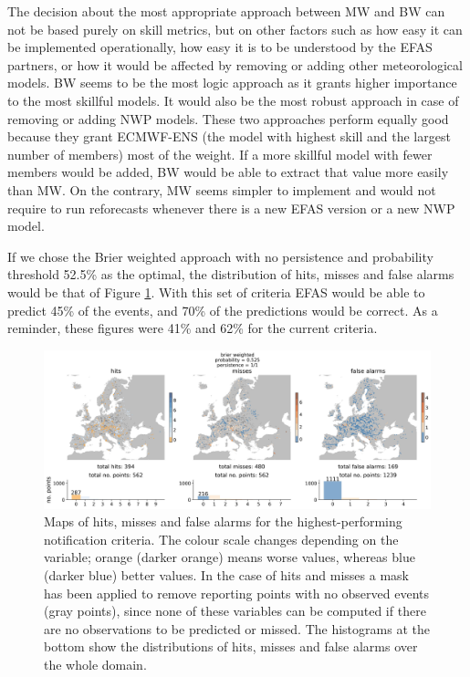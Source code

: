 \documentclass[preprint,12pt]{elsarticle}
\begin{document}
The decision about the most appropriate approach between MW and BW can not be based purely on skill metrics, but on other factors such as how easy it can be implemented operationally, how easy it is to be understood by the EFAS partners, or how it would be affected by removing or adding other meteorological models. BW seems to be the most logic approach as it grants higher importance to the most skillful models. It would also be the most robust approach in case of removing or adding NWP models. These two approaches perform equally good because they grant ECMWF-ENS (the model with highest skill and the largest number of members) most of the weight. If a more skillful model with fewer members would be added, BW would be able to extract that value more easily than MW. On the contrary, MW seems simpler to implement and would not require to run reforecasts whenever there is a new EFAS version or a new NWP model.

If we chose the Brier weighted approach with no persistence and probability threshold 52.5\% as the optimal, the distribution of hits, misses and false alarms would be that of Figure \ref{fig:maps_BW}. With this set of criteria EFAS would be able to predict 45\% of the events, and 70\% of the predictions would be correct. As a reminder, these figures were 41\% and 62\% for the current criteria.

\begin{figure}
    \centering
    \includegraphics[width=1\textwidth]{figures/hits_maps_reporting_points_2000km2_1239points_brier_weighted_060h.jpg}
    \caption{Maps of hits, misses and false alarms for the highest-performing notification criteria. The colour scale changes depending on the variable; orange (darker orange) means worse values, whereas blue (darker blue) better values. In the case of hits and misses a mask has been applied to remove reporting points with no observed events (gray points), since none of these variables can be computed if there are no observations to be predicted or missed. The histograms at the bottom show the distributions of hits, misses and false alarms over the whole domain.}
    \label{fig:maps_BW}
\end{figure}
\end{document}
